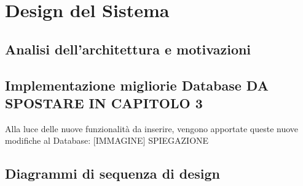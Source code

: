 \chapter{Design del Sistema}
\raggedright{\section{Analisi dell'architettura e motivazioni}}

\raggedright{\section{Implementazione migliorie Database DA SPOSTARE IN CAPITOLO 3}}
Alla luce delle nuove funzionalità da inserire, vengono apportate queste nuove modifiche al Database: 
[IMMAGINE] 
SPIEGAZIONE
\raggedright{\section{Diagrammi di sequenza di design}}
